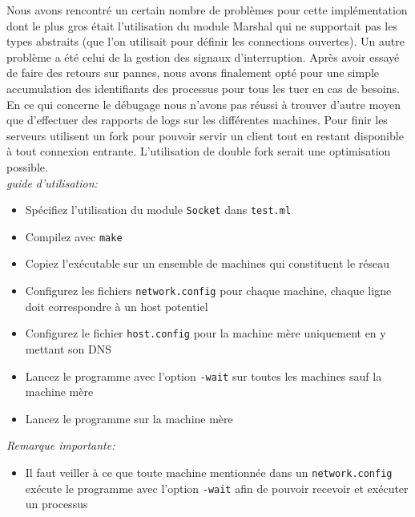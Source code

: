 \documentclass[a4paper]{article}
\begin{document}
Nous avons rencontré un certain nombre de problèmes pour cette
implémentation dont le plus gros était
l'utilisation du module Marshal qui ne supportait pas les types abstraits
(que l'on utilisait pour définir les connections ouvertes).
Un autre problème a été celui de la gestion des signaux d'interruption.
Après avoir essayé de faire des retours sur pannes, nous avons finalement
opté pour une simple accumulation des identifiants des processus pour tous
les tuer en cas de besoins.
En ce qui concerne le débugage nous n'avons pas réussi à trouver d'autre
moyen que d'effectuer des rapports de logs sur les différentes machines.
Pour finir les serveurs utilisent un fork pour pouvoir servir un client tout
en restant disponible à tout connexion entrante. L'utilisation de double
fork serait une optimisation possible.
\\
\emph{guide d'utilisation:}
\begin{itemize}
\item Spécifiez l'utilisation du module \verb!Socket! dans \verb!test.ml!
\item Compilez avec \verb!make!
\item{Copiez l'exécutable sur un ensemble de machines qui constituent le
  réseau}
\item{Configurez les fichiers \verb!network.config! pour chaque
    machine, chaque ligne doit correspondre à un host potentiel}
\item{Configurez le fichier \verb!host.config! pour la machine mère
    uniquement en y mettant son DNS}
\item{Lancez le programme avec l'option \verb!-wait! sur toutes les
    machines sauf la machine mère}
\item{Lancez le programme sur la machine mère}
\end{itemize}
\emph{Remarque importante:}
\begin{itemize}
\item{Il faut veiller à ce que toute machine mentionnée dans un
  \verb!network.config! exécute le programme avec l'option \verb!-wait!
  afin de pouvoir recevoir et exécuter un processus}
\end{itemize}
\end{document}
